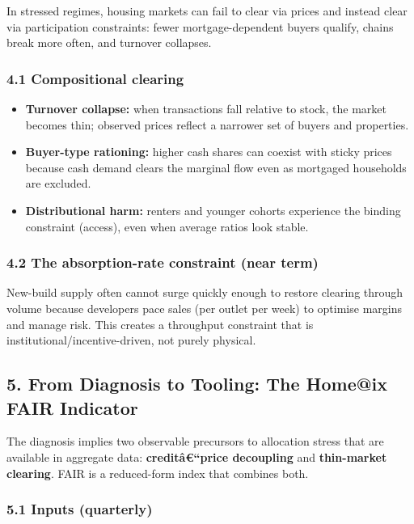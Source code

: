 In stressed regimes, housing markets can fail to clear via prices and
instead clear via participation constraints: fewer mortgage-dependent
buyers qualify, chains break more often, and turnover collapses.

\subsubsection{4.1 Compositional clearing}\label{compositional-clearing}

\begin{itemize}
\tightlist
\item
  \textbf{Turnover collapse:} when transactions fall relative to stock,
  the market becomes thin; observed prices reflect a narrower set of
  buyers and properties.
\item
  \textbf{Buyer-type rationing:} higher cash shares can coexist with
  sticky prices because cash demand clears the marginal flow even as
  mortgaged households are excluded.
\item
  \textbf{Distributional harm:} renters and younger cohorts experience
  the binding constraint (access), even when average ratios look stable.
\end{itemize}

\subsubsection{4.2 The absorption-rate constraint (near
term)}\label{the-absorption-rate-constraint-near-term}

New-build supply often cannot surge quickly enough to restore clearing
through volume because developers pace sales (per outlet per week) to
optimise margins and manage risk. This creates a throughput constraint
that is institutional/incentive-driven, not purely physical.

\subsection{5. From Diagnosis to Tooling: The Home@ix FAIR
Indicator}\label{from-diagnosis-to-tooling-the-homeix-fair-indicator}

The diagnosis implies two observable precursors to allocation stress
that are available in aggregate data: \textbf{creditâ€``price
decoupling} and \textbf{thin-market clearing}. FAIR is a reduced-form
index that combines both.

\subsubsection{5.1 Inputs (quarterly)}\label{inputs-quarterly}

